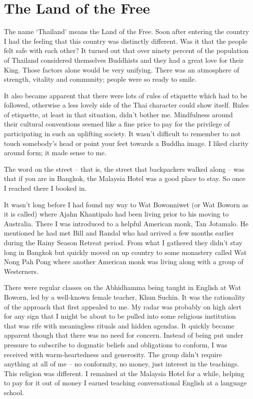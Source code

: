 \chapter{The Land of the Free}

The name `Thailand' means the Land of the Free\cite{free}.
Soon after entering the country I had the feeling
that this country was distinctly different. Was it that the people felt
safe with each other? It turned out that over ninety percent of the
population of Thailand considered themselves Buddhists and they had a
great love for their King. Those factors alone would be very unifying.
There was an atmosphere of strength, vitality and community; people were
so ready to smile.

It also became apparent that there were lots of rules of etiquette which
had to be followed, otherwise a less lovely side of the Thai character
could show itself. Rules of etiquette, at least in that situation,
didn't bother me. Mindfulness around their cultural conventions seemed
like a fine price to pay for the privilege of participating in such an
uplifting society. It wasn't difficult to remember to not touch
somebody's head or point your feet towards a Buddha image. I liked
clarity around form; it made sense to me.

The word on the street -- that is, the street that backpackers walked
along -- was that if you are in Bangkok, the Malaysia Hotel was a good
place to stay. So once I reached there I booked in.

It wasn't long before I had found my way to Wat Bowonniwet (or Wat
Boworn as it is called) where Ajahn Khantipalo had been living prior to
his moving to Australia. There I was introduced to a helpful American
monk, Tan Jotamalo. He mentioned he had met Bill and Randal who had
arrived a few months earlier during the Rainy Season Retreat period.
From what I gathered they didn't stay long in Bangkok but quickly moved
on up country to some monastery called Wat Nong Pah Pong where another
American monk was living along with a group of Westerners.

There were regular classes on the Abhidhamma being taught in English at
Wat Boworn, led by a well-known female teacher, Khun Suchin. It was the
rationality of the approach that first appealed to me. My radar was
probably on high alert for any sign that I might be about to be pulled
into some religious institution that was rife with meaningless rituals
and hidden agendas. It quickly became apparent though that there was no
need for concern. Instead of being put under pressure to subscribe to
dogmatic beliefs and obligations to conform, I was received with
warm-heartedness and generosity. The group didn't require anything at
all of me -- no conformity, no money, just interest in the teachings.
This religion was different. I remained at the Malaysia Hotel for a
while, helping to pay for it out of money I earned teaching
conversational English at a language school.

